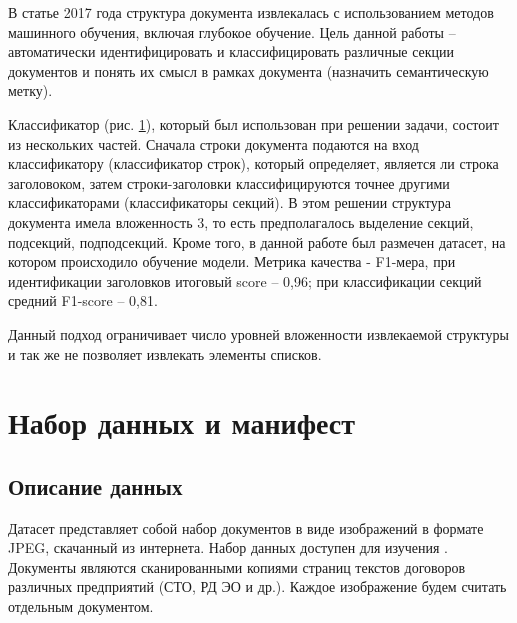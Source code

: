 \documentclass{ProcISPRAS}
\begin{document}
В статье \cite{deep} 2017 года структура документа извлекалась с использованием методов машинного обучения, включая глубокое обучение. Цель данной работы -- автоматически идентифицировать и классифицировать различные секции документов и понять их смысл в рамках документа (назначить семантическую метку).

\begin{figure}[ht]
    \label{fig:classifier}
\end{figure}

Классификатор (рис. \ref{fig:classifier}), который был использован при решении задачи, состоит из нескольких частей. Сначала строки документа подаются на вход классификатору (классификатор строк), который определяет, является ли строка заголовоком, затем строки-заголовки классифицируются точнее другими классификаторами (классификаторы секций). В этом решении структура документа имела вложенность 3, то есть предполагалось выделение секций, подсекций, подподсекций.
Кроме того, в данной работе был размечен датасет, на котором происходило обучение модели. Метрика качества - F1-мера, при идентификации заголовков итоговый score -- 0,96; при классификации секций средний F1-score -- 0,81.

Данный подход ограничивает число уровней вложенности извлекаемой структуры и так же не позволяет извлекать элементы списков.

\section{Набор данных и манифест}

\subsection{Описание данных}

Датасет представляет собой набор документов в виде изображений в формате JPEG, скачанный из интернета. Набор данных доступен для изучения \cite{data}. Документы являются сканированными копиями страниц текстов договоров различных предприятий (СТО, РД ЭО и др.). Каждое изображение будем считать отдельным документом.
\end{document}
